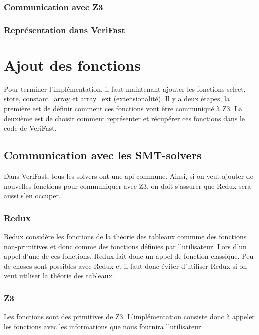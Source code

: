 \documentclass[9pt,openany]{book}
\newcommand{\verifast}{VeriFast}
\begin{document}
			\subsubsection{Communication avec Z3}
			\subsubsection{Repr\'esentation dans \verifast{}}
	\section{Ajout des fonctions}
	Pour terminer l'impl\'ementation, il faut maintenant ajouter les fonctions select, store, constant\_array et array\_ext (extensionalit\'e). Il y a deux \'etapes, la premi\`ere est de d\'efinir comment ces fonctions vont \^etre communiqu\'e \`a Z3. La deuxi\`eme est de choisir comment repr\'esenter  et r\'ecup\'erer ces fonctions dans le code de \verifast{}.
		\subsection{Communication avec les SMT-solvers}
		Dans \verifast{}, tous les solvers ont une api commune. Ainsi, si on veut ajouter de nouvelles fonctions pour communiquer avec Z3, on doit s'assurer que Redux sera aussi s'en occuper.
			\subsubsection{Redux}
			Redux consid\`ere les fonctions de la th\'eorie des tableaux commme des fonctions non-primitives et donc comme des fonctions d\'efinies par l'utilisateur. Lors d'un appel d'une de ces fonctions, Redux fait donc un appel de fonction classique. Peu de choses sont possibles avec Redux et il faut donc \'eviter d'utiliser Redux si on veut utiliser la th\'eorie des tableaux.
			\subsubsection{Z3}
			Les fonctions sont des primitives de Z3. L'impl\'ementation consiste donc \`a appeler les fonctions avec les informations que nous fournira l'utilisateur.
\end{document}
